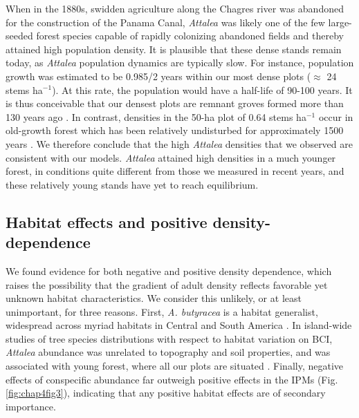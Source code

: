 \documentclass[b5paper,justified]{tufte-book} %
\begin{document}
\begin{fullwidth}
When in the 1880s, swidden agriculture along the Chagres river was abandoned for the construction of the Panama Canal, \textit{Attalea} was likely one of the few large-seeded forest species capable of rapidly colonizing abandoned fields and thereby attained high population density.  It is plausible that these dense stands remain today, as \textit{Attalea} population dynamics are typically slow. For instance, population growth was estimated to be 0.985/2 years within our most dense plots ($\approx$ 24 stems ha$^{-1}$). At this rate, the population would have a half-life of 90-100 years. It is thus conceivable that our densest plots are remnant groves formed more than 130 years ago \citep{Enders1935, Foster1982}. In contrast, densities in the 50-ha plot of 0.64 stems ha$^{-1}$ occur in old-growth forest which has been relatively undisturbed for approximately 1500 years \citep{Piperno1990}. We therefore conclude that the high \textit{Attalea} densities that we observed are consistent with our models. \textit{Attalea} attained high densities in a much younger forest, in conditions quite different from those we measured in recent years, and these relatively young stands have yet to reach equilibrium.  

\subsection{Habitat effects and positive density-dependence} 
We found evidence for both negative and positive density dependence, which raises the possibility that the gradient of adult density reflects favorable yet unknown habitat characteristics. We consider this unlikely, or at least unimportant, for three reasons. First, \textit{A. butyracea} is a habitat generalist, widespread across myriad habitats in Central and South America \citep{Steege2013}.  In island-wide studies of tree species distributions with respect to habitat variation on BCI, \textit{Attalea} abundance was unrelated to topography and soil properties, and was associated with young forest, where all our plots are situated \citep{Svenning2004,Svenning2006, Garzon-Lopez2014}. Finally, negative effects of conspecific abundance far outweigh positive effects in the IPMs (Fig. \ref{fig:chap4fig3}), indicating that any positive habitat effects are of secondary importance.


\end{fullwidth}
\end{document}
